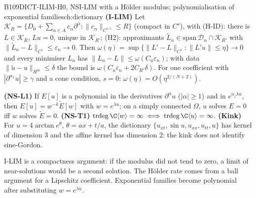 \begin{dimcard}{B109}{DICT-ILIM-H0, NS}{I-LIM with a H\"older modulus; polynomialisation of exponential families}{\pw}{ch:dictionary}
\textbf{(I-LIM)} Let $\mathcal K_R=\{D_0+\sum_{\alpha\in A}c_\alpha\partial^\alpha:\|c_\alpha\|_{C^{s,1}}\le R\}$ (compact in $C^s$), with (H-ID): there is $L\in\mathcal K_R$, $Lu=0$, unique in $\mathcal K_{R'}$; (H2): approximants $\tilde L_n\in\mathrm{span}\,\mathcal D_n\cap\mathcal K_{R'}$ with $\|\tilde L_n-L\|_{C^s}\le\varepsilon_n\to0$. Then $\omega(\eta)=\sup\{\|L'-L\|_{C^s}:\|L'u\|\le\eta\}\to0$ and every minimiser $L_n$ has $\|L_n-L\|\le\omega(C_u\varepsilon_n)$; with data $\|\tilde u-u\|_{H^m}\le\delta$ the bound is $\omega(C_u\varepsilon_n+2C_{R'}\delta)$. For one coefficient with $|\partial^{\alpha_1}u|\ge\gamma$ and a cone condition, $s=0$: $\omega(\eta)=O(\eta^{2/(N+2)})$.

\textbf{(NS-L1)} If $E[u]$ is a polynomial in the derivatives $\partial^\alpha u$ ($|\alpha|\ge1$) and in $e^{n_j\lambda u}$, then $E[u]=w^{-k}\tilde E[w]$ with $w=e^{\lambda u}$; on a simply connected $\Omega$, $u$ solves $E=0$ iff $w$ solves $\tilde E=0$. \textbf{(NS-T1)} $\mathrm{trdeg}\,\C\langle w\rangle=\infty\iff\mathrm{trdeg}\,\C\langle u\rangle=\infty$. \textbf{(Kink)} For $u=4\arctan e^\theta$, $\theta=ax+t/a$, the dictionary $\{u_{xt},\sin u,u_{xx},u_{tt},u\}$ has kernel of dimension $3$ and the affine kernel has dimension $2$: the kink does not identify sine-Gordon.
\end{dimcard}

\begin{proofidea}
I-LIM is a compactness argument: if the modulus did not tend to zero, a limit of near-solutions would be a second solution. The Hölder rate comes from a ball argument for a Lipschitz coefficient. Exponential families become polynomial after substituting $w=e^{\lambda u}$.
\end{proofidea}

